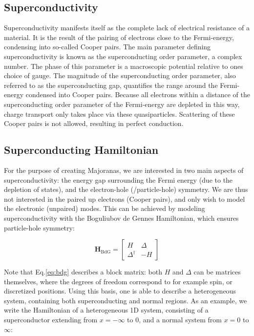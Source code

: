     \subsection{Superconductivity}
		Superconductivity manifests itself as the complete lack of electrical resistance of a material.
		It is the result of the pairing of electrons close to the Fermi-energy, condensing into so-called Cooper pairs.
		The main parameter defining superconductivity is known as the superconducting order parameter, a complex number.
		The phase of this parameter is a macroscopic potential relative to ones choice of gauge.
		The magnitude of the superconducting order parameter, also referred to as the superconducting gap, quantifies the range around the Fermi-energy condensed into Cooper pairs.
		Because all electrons within a distance of the superconducting order parameter of the Fermi-energy are depleted in this way, charge transport only takes place via these quasiparticles.
		Scattering of these Cooper pairs is not allowed, resulting in perfect conduction.

	\subsection{Superconducting Hamiltonian}
		For the purpose of creating Majoranas, we are interested in two main aspects of superconductivity: the energy gap surrounding the Fermi energy (due to the depletion of states), and the electron-hole (/particle-hole) symmetry.
		We are thus not interested in the paired up electrons (Cooper pairs), and only wish to model the electronic (unpaired) modes.
		This can be achieved by modeling superconductivity with the Boguliubov de Gennes Hamiltonian, which ensures particle-hole symmetry:
		
		\begin{equation}
		\mathbf{H}_\text{BdG} = \begin{bmatrix} H & \Delta \\ \Delta^\dagger & -H \end{bmatrix}
		\label{eq:bdg}
		\end{equation}

		Note that Eq.\eqref{eq:bdg} describes a block matrix: both $H$ and $\Delta$ can be matrices themselves, where the degrees of freedom correspond to for example spin, or discretized positions.
		Using this basis, one is able to describe a heterogeneous system, containing both superconducting and normal regions.
		As an example, we write the Hamiltonian of a heterogeneous 1D system, consisting of a superconductor extending from $x = -\infty$ to $0$, and a normal system from  $x = 0$ to $\infty$:

